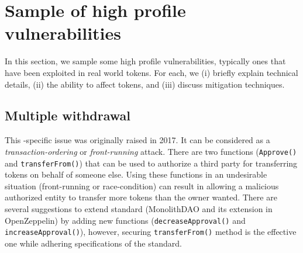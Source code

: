 
\section{Sample of high profile vulnerabilities}\label{sec:vul}
In this section, we sample some high profile vulnerabilities, typically ones that have been exploited in real world \erc tokens\cite{SolidtySecBlog,EthSecServ,SoliditySecCon,ConsensysSecCon,LandoKL}. For each, we (i) briefly explain technical details, (ii) the ability to affect \erc tokens, and (iii) discuss mitigation techniques. 

\subsection{Multiple withdrawal}\label{subsec:mwa}

This \erc-specific issue was originally raised in 2017\cite{MikVlad,TomHale}. It can be considered as a \textit{transaction-ordering}\cite{OrderingAttack} or \textit{front-running}\cite{eskandari2019sok} attack. There are two \erc functions (\ie \texttt{Approve()} and \texttt{transferFrom()}) that can be used to authorize a third party for transferring tokens on behalf of someone else. Using these functions in an undesirable situation (\ie front-running or race-condition) can result in allowing a malicious authorized entity to transfer more tokens than the owner wanted. There are several suggestions to extend \erc standard (\eg MonolithDAO\cite{MonolithDAO} and its extension in OpenZeppelin\cite{OpenZepplin}) by adding new functions (\ie \texttt{decreaseApproval()} and \texttt{increaseApproval()}), however, securing \texttt{transferFrom()} method is the effective one while adhering specifications of the \erc standard\cite{ERC20MWA}.

